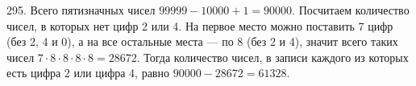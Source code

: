 295. Всего пятизначных чисел $99999-10000+1=90000.$ Посчитаем количество чисел, в которых нет цифр 2 или 4. На первое место можно поставить 7 цифр (без 2, 4 и 0), а на все остальные места --- по 8 (без 2 и 4), значит всего таких чисел $7\cdot8\cdot8\cdot8\cdot8=28672.$ Тогда количество чисел, в записи каждого из которых есть цифра 2 или цифра 4, равно $90000-28672=61328.$\\
